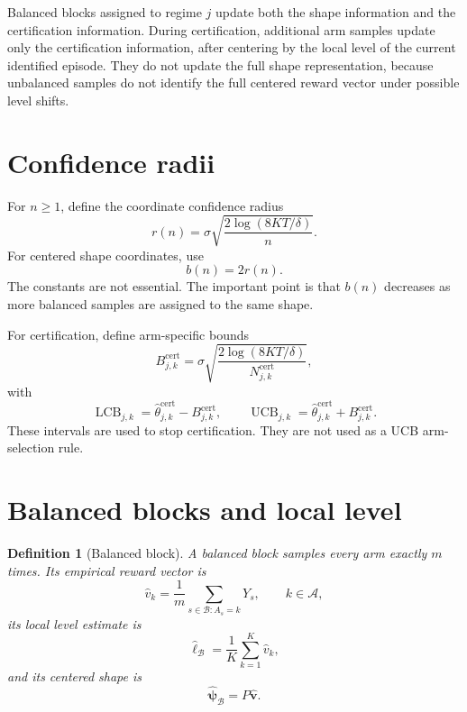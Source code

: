 \documentclass[11pt]{article}
\newtheorem{definition}{Definition}
\newcommand{\A}{\mathcal A}
\newcommand{\LCB}{\operatorname{LCB}}
\newcommand{\UCB}{\operatorname{UCB}}
\begin{document}
Balanced blocks assigned to regime $j$ update both the shape information and the certification information. During certification, additional arm samples update only the certification information, after centering by the local level of the current identified episode. They do not update the full shape representation, because unbalanced samples do not identify the full centered reward vector under possible level shifts.

\section{Confidence radii}

For $n\geq1$, define the coordinate confidence radius
\begin{equation}
    r(n)=\sigma\sqrt{\frac{2\log(8KT/\delta)}{n}}.
    \label{eq:coord-radius}
\end{equation}
For centered shape coordinates, use
\begin{equation}
    b(n)=2r(n).
    \label{eq:shape-radius}
\end{equation}
The constants are not essential. The important point is that $b(n)$ decreases as more balanced samples are assigned to the same shape.

For certification, define arm-specific bounds
\begin{equation}
    B_{j,k}^{\mathrm{cert}}
    =
    \sigma\sqrt{\frac{2\log(8KT/\delta)}{N_{j,k}^{\mathrm{cert}}}},
    \label{eq:cert-radius}
\end{equation}
with
\begin{equation}
    \LCB_{j,k}
    =
    \widehat\theta_{j,k}^{\mathrm{cert}}-B_{j,k}^{\mathrm{cert}},
    \qquad
    \UCB_{j,k}
    =
    \widehat\theta_{j,k}^{\mathrm{cert}}+B_{j,k}^{\mathrm{cert}}.
    \label{eq:cert-bounds}
\end{equation}
These intervals are used to stop certification. They are not used as a UCB arm-selection rule.

\section{Balanced blocks and local level}

\begin{definition}[Balanced block]
A balanced block samples every arm exactly $m$ times. Its empirical reward vector is
\begin{equation}
    \widehat v_k
    =
    \frac{1}{m}\sum_{s\in\mathcal B:A_s=k}Y_s,
    \qquad k\in\A,
    \label{eq:block-vector}
\end{equation}
its local level estimate is
\begin{equation}
    \widehat\ell_{\mathcal B}
    =
    \frac{1}{K}\sum_{k=1}^K\widehat v_k,
    \label{eq:block-level}
\end{equation}
and its centered shape is
\begin{equation}
    \widehat{\bm\psi}_{\mathcal B}=P\widehat{\bm v}.
    \label{eq:block-shape}
\end{equation}
\end{definition}
\end{document}
